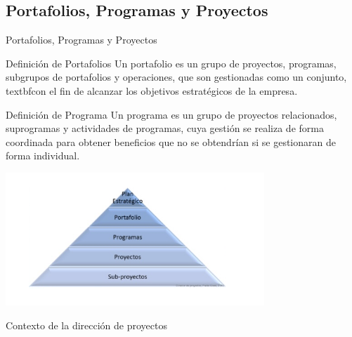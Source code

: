 \subsection{Portafolios, Programas y Proyectos}
\begin{frame}[allowframebreaks]{Portafolios, Programas y Proyectos}
	
	\begin{block}{Definición de Portafolios}
		Un portafolio es un grupo de proyectos, programas, subgrupos de  portafolios y operaciones, que son gestionadas como un conjunto, textbf{con el fin de alcanzar los objetivos estratégicos de la empresa}.
	\end{block}


	\framebreak

	\begin{block}{Definición de Programa}
		Un programa es un grupo de proyectos relacionados, suprogramas y actividades de programas, cuya gestión se realiza de forma coordinada para obtener beneficios que no se obtendrían si se gestionaran de forma individual.
	\end{block}


	\framebreak
	\begin{center}
		\includegraphics[height=5cm]{figuras/proy_prog_port_00.png}

		Contexto de la dirección de proyectos
	\end{center}

\end{frame}


